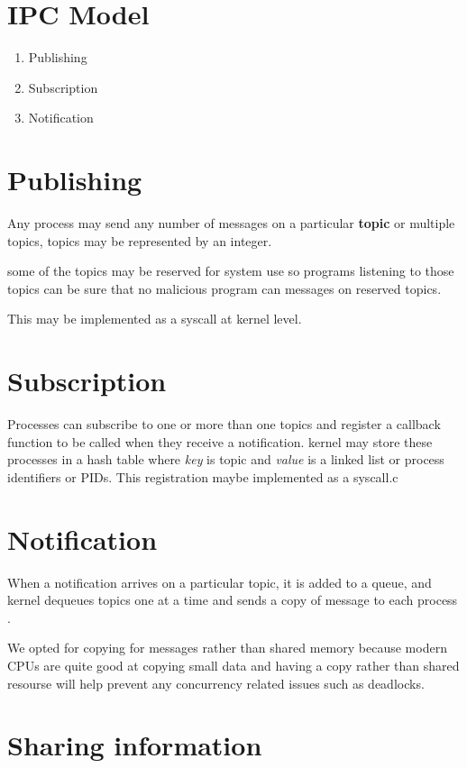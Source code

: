 \documentclass[12pt]{report}
\begin{document}
	\section{IPC Model}
	\begin{enumerate}
		\item Publishing
		\item Subscription
		\item Notification
	\end{enumerate}

	
	\section{Publishing}
	Any process may send any number of messages on a particular \textbf{topic} or 
	multiple topics, topics may be represented by an integer.

	some of the topics may be reserved for system use so programs listening to those
	topics can be sure that no malicious program can messages on reserved topics.
	
	This may be implemented as a syscall at kernel level.
				 	
	\section{Subscription}
	Processes can subscribe to one or more than one topics and register a callback
	function to be called when they receive a notification.
	kernel may store these processes in a hash table where \textit{key} is topic 
	and \textit{value} is a linked list or process identifiers or PIDs.
	This registration maybe implemented as a syscall.c
		
	\section{Notification}
	When a notification arrives on a particular topic, it is added to a queue,
	and kernel dequeues topics one at a time and sends a copy of message to each 
	process \cite{citation04}.
	
	We opted for copying for messages rather than shared memory because
	modern CPUs are quite good at copying small data and having a copy rather than
	shared resourse will help prevent any concurrency related issues such as deadlocks.	

    \section{Sharing information}
\end{document}
